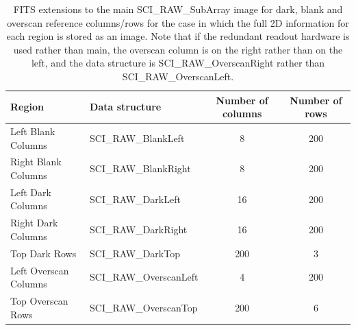 \documentclass[11pt]{article}      %
\begin{document}
\begin{table}[h]
  \begin{center}
  \caption{FITS extensions to the main SCI\_RAW\_SubArray image for dark, blank and overscan reference columns/rows for the case in which the full 2D information for each region is stored as an image. Note that if the redundant readout hardware is used rather than main, the overscan column is on the right rather than on the left, and the data structure is SCI\_RAW\_OverscanRight rather than SCI\_RAW\_OverscanLeft.}
  \begin{tabular}{| l | l | c | c |}
    \hline 
   Region & Data structure & Number of columns & Number of rows\\
    \hline
Left Blank Columns & SCI\_RAW\_BlankLeft  & 8 & 200 \\
Right Blank Columns & SCI\_RAW\_BlankRight  & 8 & 200 \\
Left Dark Columns & SCI\_RAW\_DarkLeft  & 16 & 200 \\
Right Dark Columns & SCI\_RAW\_DarkRight  & 16 & 200 \\
Top Dark Rows & SCI\_RAW\_DarkTop  & 200 & 3 \\
Left Overscan Columns & SCI\_RAW\_OverscanLeft  & 4 & 200 \\
Top Overscan Rows & SCI\_RAW\_OverscanTop  & 200 & 6 \\
    \hline
  \end{tabular}
  \label{tab:ccdMarginImages}
  \end{center}
\end{table}
\end{document}
